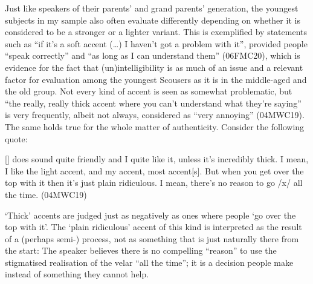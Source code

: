Just like speakers of their parents' and grand parents' generation, the youngest subjects in my sample also often evaluate  differently depending on whether it is considered to be a stronger or a lighter variant.
This is exemplified by statements such as ``if it's a soft  accent (\ldots) I haven't got a problem with it'', provided people ``speak correctly'' and ``as long as I can understand them'' (06FMC20), which is evidence for the fact that (un)intelligibility is as much of an issue and a relevant factor for evaluation among the youngest Scousers as it is in the middle-aged and the old group.
Not every kind of  accent is seen as somewhat problematic, but ``the really, really thick accent where you can't understand what they're saying'' is very frequently, albeit not always, considered as ``very annoying'' (04MWC19).
The same holds true for the whole matter of authenticity.
Consider the following quote:
\begin{example}
	{}[] does sound quite friendly and I quite like it, unless it's incredibly thick.
	I mean, I like the light accent, and my accent, most  accent[s].
	But when you get over the top with it then it's just plain ridiculous.
	I mean, there's no reason to go /x/ all the time. (04MWC19)
\end{example}
`Thick' accents are judged just as negatively as  ones where people `go over the top with it'.
The `plain ridiculous' accent of this kind is interpreted as the result of a (perhaps semi-) process, not as something that is just naturally there from the start: The speaker believes there is no compelling ``reason'' to use the stigmatised  realisation of the velar  ``all the time''; it is a decision people make instead of something they cannot help.

